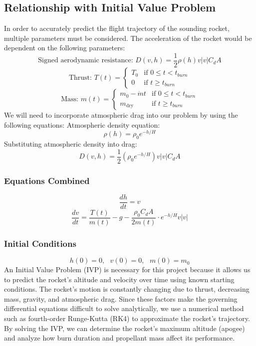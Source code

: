 \documentclass{article}
\begin{document}
\subsection{Relationship with Initial Value Problem}
In order to accurately predict the flight trajectory of the sounding rocket, multiple parameters must be considered. The acceleration of the rocket would be dependent on the following parameters:
\[\text{Signed aerodynamic resistance: }D\left(v,h\right)  = \frac{1}{2} \rho \left(h \right) v|v| C_d A\]
\[\text{Thrust: } T\left(t\right) = \begin{cases}
    T_0 & \text{if } 0\leq t < t_{burn} \\
    0  & \text{if } t \geq t_{burn} \end{cases} \]
\[\text{Mass: } m\left(t\right)  = \begin{cases}
    m_0 -\dot{m}t & \text{if } 0\leq t < t_{burn} \\
    m_\text{dry}  & \text{if } t \geq t_{burn} \end{cases} \]
We will need to incorporate atmospheric drag into our problem by using the following equations: 
Atmospheric density equation: 
\[\displaystyle \rho\left( h\right ) = \rho_0 e^{-h/H}\]
Substituting atmospheric density into drag:
\[D\left(v,h\right)  = \frac{1}{2} \left( \rho_0 e^{-h/H} \right) v|v| C_d A\]

\subsubsection{Equations Combined}
\[\boxed{\frac{dh}{dt} = v}\]
\[\boxed{\frac{dv}{dt} = \frac{T\left(t\right)}{m\left(t\right)}-g - \frac{\rho_0 C_d A}{2m\left(t\right)}\cdot e^{-h/H}v|v|}\]

\subsubsection{Initial Conditions}
\[h(0) = 0,\text{ } v(0) = 0,\text{ } m(0)=m_0\]
An Initial Value Problem (IVP) is necessary for this project because it allows us to predict the rocket's altitude and velocity over time using known starting conditions. The rocket's motion is constantly changing due to thrust, decreasing mass, gravity, and atmospheric drag. Since these factors make the governing differential equations difficult to solve analytically, we use a numerical method such as fourth-order Runge-Kutta (RK4) to approximate the rocket's trajectory. By solving the IVP, we can determine the rocket's maximum altitude (apogee) and analyze how burn duration and propellant mass affect its performance.
\end{document}
